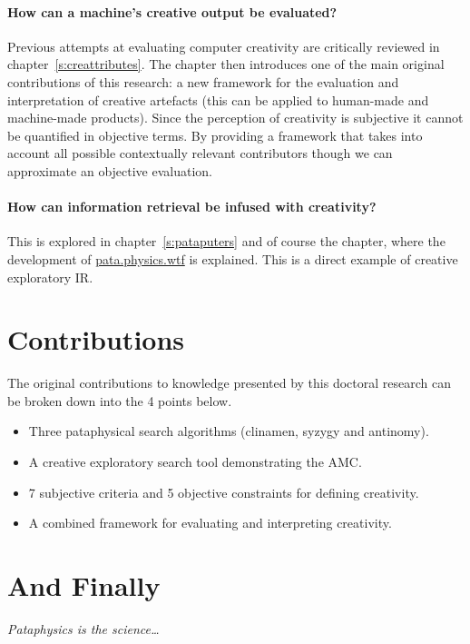 \paragraph{How can a machine's creative output be evaluated?}

Previous attempts at evaluating computer creativity are critically reviewed in chapter~\ref{s:creattributes}. The  chapter then introduces one of the main original contributions of this research: a new framework for the evaluation and interpretation of creative artefacts (this can be applied to human-made and machine-made products). Since the perception of creativity is subjective it cannot be quantified in objective terms. By providing a framework that takes into account all possible contextually relevant contributors though we can approximate an objective evaluation.

\paragraph{How can information retrieval be infused with creativity?}

This is explored in chapter~\ref{s:pataputers} and of course the  chapter, where the development of \url{pata.physics.wtf} is explained. This is a direct example of creative exploratory \ac{IR}.


\section{Contributions}

The original contributions to knowledge presented by this doctoral research can be broken down into the 4 points below.

\begin{itemize}
  \item Three pataphysical search algorithms (clinamen, syzygy and antinomy).
  \item A creative exploratory search tool demonstrating the \ac{AMC}.
  \item 7 subjective criteria and 5 objective constraints for defining creativity.
  \item A combined framework for evaluating and interpreting creativity.
\end{itemize}


\section{And Finally}

\emph{Pataphysics is the science\ldots}

\stopcontents[chapters]
